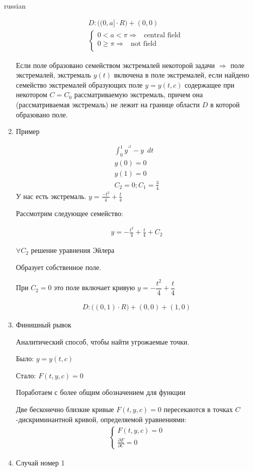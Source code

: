 \documentclass{article}
\begin{document}
\begin{otherlanguage*}{russian}
\begin{enumerate}
\begin{align*}
D: \Big( (0, a] \cdot R \Big) + (0, 0) \\
\begin{cases}
0 < a < \pi \Rightarrow \,\,\, \operatorname{central\,\, field} \\
0 \ge \pi \Rightarrow \,\,\, \operatorname{not \,\, field} \\
\end{cases}
\end{align*}

Если поле образовано семейством экстремалей некоторой задачи $ \Rightarrow $ поле экстремалей, экстремаль $ y(t) $ включена в поле экстремалей, если найдено семейство экстремалей образующих поле $ y = y(t, c) $ содержащее при некотором $ C = C_0 $ рассматриваемую экстремаль, причем она (рассматриваемая экстремаль) не лежит на границе области $ D $ в которой образовано поле. 

\item Пример

\begin{align*}
\int_0^1 y^{'^{2}} - y \,\,\, dt \\
y(0) = 0 \\
y(1) = 0 \\
C_2 = 0; C_1 = \frac{3}{4}
\end{align*}
У нас есть экстремаль.  $ y = \frac{-t^2}{4} + \frac{t}{4} $ 

Рассмотрим следующее семейство: 

\begin{align*}
y = - \frac{t^2}{4} + \frac{t}{4} + C_2 
\end{align*}

$ \forall C_2 $ решение уравнения Эйлера 

Образует собственное поле. 

При $ C_2 = 0 $ это поле включает кривую $ y = - \dfrac{t^2}{4} + \dfrac{t}{4} $ 

\begin{align*}
D: \Big( (0,1 ) \cdot R \Big) + (0,0) + (1, 0) 
\end{align*}
\item Финишный рывок 

Аналитический способ, чтобы найти угрожаемые точки. 

Было: $ y = y(t, c) $ 

Стало: $ F(t, y, c) = 0 $ 

Поработаем с более общим обозначением для функции  

Две бесконечно близкие кривые $ F(t, y, c) = 0 $ пересекаются в точках $ C $-дискриминантной кривой, определяемой уравнениями: 
\begin{align*}
\begin{cases}
F(t, y, c) = 0 \\
\frac{\partial F}{\partial C} = 0 
\end{cases}
\end{align*}
\item Случай номер 1


\end{enumerate}
\end{otherlanguage*}
\end{document}
